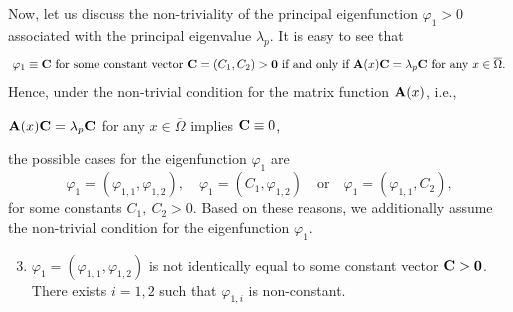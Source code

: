 \documentclass[a4paper,11pt]{amsart}
\theoremstyle{definition}
\def\O{\Omega}
\numberwithin{equation}{section}
\theoremstyle{definition}
\def\O{\Omega}
\begin{document}
Now, let us discuss the non-triviality of the principal eigenfunction $\varphi_1>0$ associated with the principal eigenvalue $\lambda_p$. It is easy to see that
\begin{align*}
\text{ $\varphi_1\equiv{\bf C}$ for some constant vector ${\bf C}=(C_1,C_2)>{\bf 0}$  if and only if ${\bf A}(x){\bf C}=\lambda_p {\bf C}$ for any $x\in \overline{\O}$. }
\end{align*}
Hence, under the non-trivial condition for the matrix function ${\bf A}(x)$, 
i.e., 
\begin{center}
${\bf A}(x){\bf C}=\lambda_p{\bf C}$ for any $x\in \overline{\O}$ implies ${\bf C}\equiv 0$, 
\end{center}
the possible cases for the eigenfunction $\varphi_1$ are 
\[
\varphi_1=(\varphi_{1,1},\varphi_{1,2}), \quad 
\varphi_1=(C_1,\varphi_{1,2}) \quad \text{or} \quad 
\varphi_1=(\varphi_{1,1},C_2),
\]
for some constants $C_1,~C_2>0$. Based on these reasons, we additionally assume the non-trivial condition for the eigenfunction $\varphi_1$.
\begin{enumerate}[label=(A\arabic*)]  
\setcounter{enumi}{2}
\item \label{cond:cond31} $\varphi_1=(\varphi_{1,1},\varphi_{1,2})$ is not identically equal to some constant vector ${\bf C}>{\bf 0}$. There exists $i=1,2$ such that $\varphi_{1,i}$ is non-constant.
\end{enumerate}
\end{document}
